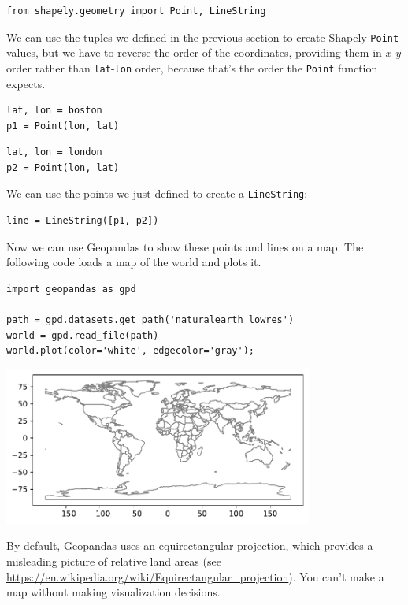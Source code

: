 \begin{lstlisting}[]
from shapely.geometry import Point, LineString
\end{lstlisting}

We can use the tuples we defined in the previous section to create
Shapely \passthrough{\lstinline!Point!} values, but we have to reverse
the order of the coordinates, providing them in \(x\)-\(y\) order rather
than \passthrough{\lstinline!lat!}-\passthrough{\lstinline!lon!} order,
because that's the order the \passthrough{\lstinline!Point!} function
expects.

\begin{lstlisting}[]
lat, lon = boston
p1 = Point(lon, lat)
\end{lstlisting}

\begin{lstlisting}[]
lat, lon = london
p2 = Point(lon, lat)
\end{lstlisting}

We can use the points we just defined to create a
\passthrough{\lstinline!LineString!}:

\begin{lstlisting}[]
line = LineString([p1, p2])
\end{lstlisting}

Now we can use Geopandas to show these points and lines on a map. The
following code loads a map of the world and plots it.

\begin{lstlisting}[]
import geopandas as gpd

path = gpd.datasets.get_path('naturalearth_lowres')
world = gpd.read_file(path)
world.plot(color='white', edgecolor='gray');
\end{lstlisting}

\begin{center}
\includegraphics[width=4in]{chapters/02_times_files/02_times_122_0.pdf}
\end{center}

By default, Geopandas uses an equirectangular projection, which provides
a misleading picture of relative land areas (see
\url{https://en.wikipedia.org/wiki/Equirectangular_projection}). You
can't make a map without making visualization decisions.


